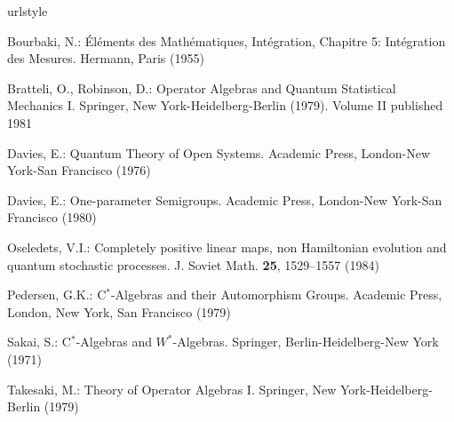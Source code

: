 \begin{thebibliography}{1}
\providecommand{\url}[1]{{#1}}
\providecommand{\urlprefix}{URL }
\expandafter\ifx\csname urlstyle\endcsname\relax
  \providecommand{\doi}[1]{DOI~\discretionary{}{}{}#1}\else
  \providecommand{\doi}{DOI~\discretionary{}{}{}\begingroup
  \urlstyle{rm}\Url}\fi

Bourbaki, N.: {\'E}l{\'e}ments des Math{\'e}matiques, Int{\'e}gration, Chapitre
  5: Int{\'e}gration des Mesures.
\newblock Hermann, Paris (1955)

Bratteli, O., Robinson, D.: Operator Algebras and Quantum Statistical Mechanics
  {I}.
\newblock Springer, New York-Heidelberg-Berlin (1979).
\newblock Volume II published 1981

Davies, E.: Quantum Theory of Open Systems.
\newblock Academic Press, London-New York-San Francisco (1976)

Davies, E.: One-parameter Semigroups.
\newblock Academic Press, London-New York-San Francisco (1980)

Oseledets, V.I.: Completely positive linear maps, non {Hamiltonian} evolution
  and quantum stochastic processes.
\newblock J. Soviet Math. \textbf{25}, 1529--1557 (1984)

Pedersen, G.K.: {C$^{*}$}-Algebras and their Automorphism Groups.
\newblock Academic Press, London, New York, San Francisco (1979)

Sakai, S.: {C$^{*}$}-Algebras and {$W^*$}-Algebras.
\newblock Springer, Berlin-Heidelberg-New York (1971)

Takesaki, M.: Theory of Operator Algebras {I}.
\newblock Springer, New York-Heidelberg-Berlin (1979)

\end{thebibliography}
